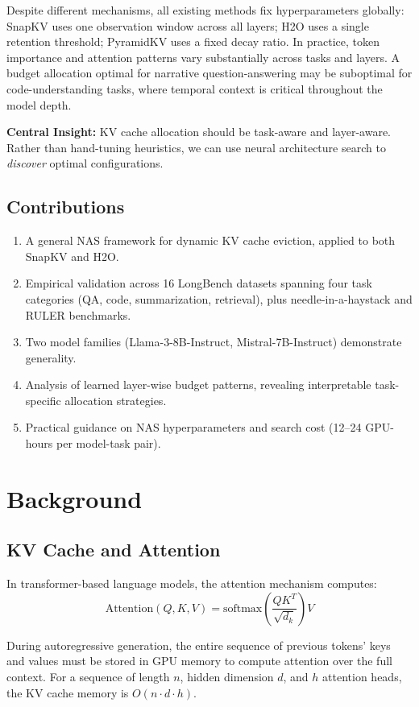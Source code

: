 \documentclass[11pt]{article}
\begin{document}
Despite different mechanisms, all existing methods fix hyperparameters globally: SnapKV uses one observation window across all layers; H2O uses a single retention threshold; PyramidKV uses a fixed decay ratio. In practice, token importance and attention patterns vary substantially across tasks and layers. A budget allocation optimal for narrative question-answering may be suboptimal for code-understanding tasks, where temporal context is critical throughout the model depth.

\textbf{Central Insight:} KV cache allocation should be task-aware and layer-aware. Rather than hand-tuning heuristics, we can use neural architecture search to \emph{discover} optimal configurations.

\subsection{Contributions}

\begin{enumerate}
    \item A general NAS framework for dynamic KV cache eviction, applied to both SnapKV and H2O.
    \item Empirical validation across 16 LongBench datasets spanning four task categories (QA, code, summarization, retrieval), plus needle-in-a-haystack and RULER benchmarks.
    \item Two model families (Llama-3-8B-Instruct, Mistral-7B-Instruct) demonstrate generality.
    \item Analysis of learned layer-wise budget patterns, revealing interpretable task-specific allocation strategies.
    \item Practical guidance on NAS hyperparameters and search cost (12–24 GPU-hours per model-task pair).
\end{enumerate}

\section{Background}

\subsection{KV Cache and Attention}

In transformer-based language models, the attention mechanism computes:
\[
\text{Attention}(Q, K, V) = \text{softmax}\left(\frac{QK^T}{\sqrt{d_k}}\right) V
\]

During autoregressive generation, the entire sequence of previous tokens' keys and values must be stored in GPU memory to compute attention over the full context. For a sequence of length $n$, hidden dimension $d$, and $h$ attention heads, the KV cache memory is $O(n \cdot d \cdot h)$.
\end{document}
